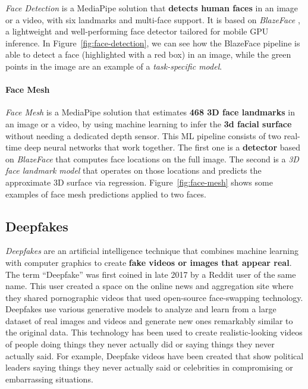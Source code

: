 \documentclass[preprint]{elsarticle}
\begin{document}
\emph{Face Detection} is a MediaPipe solution that \textbf{detects human faces} in an image or a video,
with six landmarks and multi-face support.
It is based on \emph{BlazeFace} \cite{bazarevsky2019blazeface}, a lightweight and well-performing 
face detector tailored for mobile GPU inference.
In Figure~\ref{fig:face-detection}, we can see how the BlazeFace pipeline is able to detect a face 
(highlighted with a red box) in an image, while the green points in the image are an example of a
\emph{task-specific model}.

\paragraph{Face Mesh}


\emph{Face Mesh} is a MediaPipe solution that estimates \textbf{468 3D face landmarks} in an image or a video,
by using machine learning to infer the \textbf{3d facial surface} without needing a dedicated depth sensor.
This ML pipeline consists of two real-time deep neural networks that work together.
The first one is a \textbf{detector} based on \emph{BlazeFace} that computes face locations on the full image.
The second is a \emph{3D face landmark model} \cite{kartynnik2019realtime} that operates on those locations and predicts the 
approximate 3D surface via regression. Figure~\ref{fig:face-mesh} shows some examples of face mesh predictions applied to two faces.


\subsection{Deepfakes}
\emph{Deepfakes} are an artificial intelligence technique that combines machine learning with computer graphics to create \textbf{fake videos or images that appear real}. 
The term “Deepfake” was first coined in late 2017 by a Reddit user of the same name. 
This user created a space on the online news and aggregation site where they shared pornographic videos that used open-source face-swapping technology.
Deepfakes use various generative models to analyze and learn from a large dataset of real images and videos and generate new ones remarkably similar to the original data.
This technology has been used to create realistic-looking videos of people doing things they never actually did or saying things they never actually said. 
For example, Deepfake videos have been created that show political leaders saying things they never actually said or celebrities in compromising or embarrassing situations.
\end{document}
